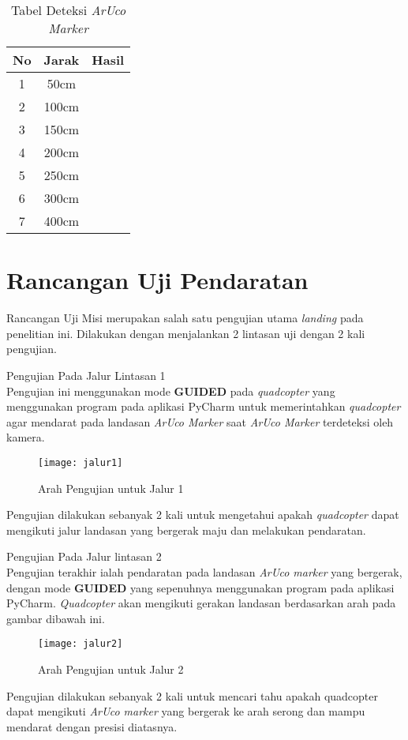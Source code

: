 \begin{table}[h]
	\caption{Tabel Deteksi \textit{ArUco Marker}}
	\label{tab:deteksiaruco}
	\centering
	\begin{tabular}{|c|c|c|}
		\hline
		\textbf{No} & \textbf{Jarak}    & \textbf{Hasil}	   \\ \hline
		1  & 50cm     &            \\ \hline
		2  & 100cm    &            \\ \hline
		3  & 150cm    &            \\ \hline
		4  & 200cm    &            \\ \hline
		5  & 250cm    &            \\ \hline
		6  & 300cm    &            \\ \hline
		7  & 400cm    &            \\ \hline
	\end{tabular}
\end{table}

\section{Rancangan Uji Pendaratan}
Rancangan Uji Misi merupakan salah satu pengujian utama \textit{landing} pada penelitian ini. Dilakukan dengan menjalankan 2 lintasan uji dengan 2 kali pengujian.

\begin{packed_enum}
	\item Pengujian Pada Jalur Lintasan 1
	\\Pengujian ini menggunakan mode \textbf{GUIDED} pada \textit{quadcopter} yang menggunakan program pada aplikasi PyCharm untuk memerintahkan \textit{quadcopter} agar mendarat pada landasan \textit{ArUco Marker} saat \textit{ArUco Marker} terdeteksi oleh kamera. 
	
	\begin{figure}[H]
		\centering
		\texttt{[image: jalur1]}
		\caption{Arah Pengujian untuk Jalur 1}
		\label{fig:jalur1}
	\end{figure}
	
	Pengujian dilakukan sebanyak 2 kali untuk mengetahui apakah \textit{quadcopter} dapat mengikuti jalur landasan yang bergerak maju dan melakukan pendaratan.
	
	\item Pengujian Pada Jalur lintasan 2
	\\Pengujian terakhir ialah pendaratan pada landasan \textit{ArUco marker} yang bergerak, dengan mode \textbf{GUIDED} yang sepenuhnya menggunakan program pada aplikasi PyCharm. \textit{Quadcopter} akan mengikuti gerakan landasan berdasarkan arah pada gambar dibawah ini.
	
	\begin{figure}[H]
		\centering
		\texttt{[image: jalur2]}
		\caption{Arah Pengujian untuk Jalur 2}
		\label{fig:jalur2}
	\end{figure}
	
	Pengujian dilakukan sebanyak 2 kali untuk mencari tahu apakah quadcopter dapat mengikuti \textit{ArUco marker} yang bergerak ke arah serong dan mampu mendarat dengan presisi diatasnya.
	
\end{packed_enum}

